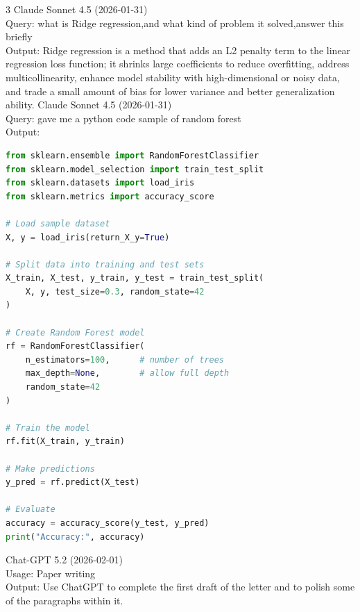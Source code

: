 \documentclass{mcmthesis}
\begin{document}
\newpage
{}
\AImatter
\begin{ReportAiUse}{3}
Claude Sonnet 4.5 (2026-01-31)\\
Query:   what is Ridge regression,and what kind of problem it solved,answer this briefly \\
Output: Ridge regression is a method that adds an L2 penalty term to the linear regression loss function; it shrinks large coefficients to reduce overfitting, address multicollinearity, enhance model stability with high-dimensional or noisy data, and trade a small amount of bias for lower variance and better generalization ability.
Claude Sonnet 4.5 (2026-01-31)\\
Query: gave me a python code sample of random forest\\
Output:
\begin{lstlisting}[language=python]
from sklearn.ensemble import RandomForestClassifier
from sklearn.model_selection import train_test_split
from sklearn.datasets import load_iris
from sklearn.metrics import accuracy_score

# Load sample dataset
X, y = load_iris(return_X_y=True)

# Split data into training and test sets
X_train, X_test, y_train, y_test = train_test_split(
    X, y, test_size=0.3, random_state=42
)

# Create Random Forest model
rf = RandomForestClassifier(
    n_estimators=100,      # number of trees
    max_depth=None,        # allow full depth
    random_state=42
)

# Train the model
rf.fit(X_train, y_train)

# Make predictions
y_pred = rf.predict(X_test)

# Evaluate
accuracy = accuracy_score(y_test, y_pred)
print("Accuracy:", accuracy)
\end{lstlisting}
Chat-GPT 5.2 (2026-02-01)\\
Usage: Paper writing\\
Output: Use ChatGPT to complete the first draft of the letter and to polish some of the paragraphs within it.
\end{ReportAiUse}
\end{document}
